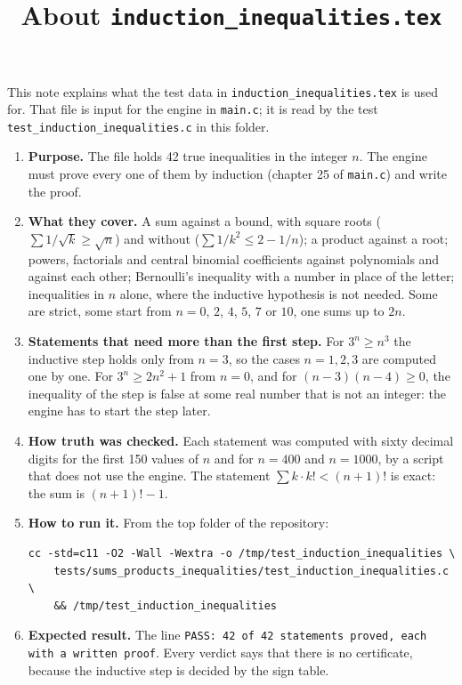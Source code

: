 \documentclass[11pt,a4paper]{article}
\title{About \texttt{induction\_inequalities.tex}}
\author{}
\date{}
\begin{document}
\maketitle
This note explains what the test data in \texttt{induction\_inequalities.tex} is used for. That file is input for the engine in \texttt{main.c}; it is read by the test \texttt{test\_induction\_inequalities.c} in this folder.

\begin{enumerate}
\item \textbf{Purpose.} The file holds 42 true inequalities in the integer $n$. The engine must prove every one of them by induction (chapter 25 of \texttt{main.c}) and write the proof.

\item \textbf{What they cover.} A sum against a bound, with square roots ($\sum 1/\sqrt{k} \ge \sqrt{n}$) and without ($\sum 1/k^{2} \le 2 - 1/n$); a product against a root; powers, factorials and central binomial coefficients against polynomials and against each other; Bernoulli's inequality with a number in place of the letter; inequalities in $n$ alone, where the inductive hypothesis is not needed. Some are strict, some start from $n = 0$, $2$, $4$, $5$, $7$ or $10$, one sums up to $2n$.

\item \textbf{Statements that need more than the first step.} For $3^{n} \ge n^{3}$ the inductive step holds only from $n = 3$, so the cases $n = 1, 2, 3$ are computed one by one. For $3^{n} \ge 2n^{2} + 1$ from $n = 0$, and for $(n - 3)(n - 4) \ge 0$, the inequality of the step is false at some real number that is not an integer: the engine has to start the step later.

\item \textbf{How truth was checked.} Each statement was computed with sixty decimal digits for the first 150 values of $n$ and for $n = 400$ and $n = 1000$, by a script that does not use the engine. The statement $\sum k \cdot k! < (n + 1)!$ is exact: the sum is $(n + 1)! - 1$.

\item \textbf{How to run it.} From the top folder of the repository:
\begin{verbatim}
cc -std=c11 -O2 -Wall -Wextra -o /tmp/test_induction_inequalities \
    tests/sums_products_inequalities/test_induction_inequalities.c \
    && /tmp/test_induction_inequalities
\end{verbatim}

\item \textbf{Expected result.} The line \texttt{PASS: 42 of 42 statements proved, each with a written proof}. Every verdict says that there is no certificate, because the inductive step is decided by the sign table.


\end{enumerate}
\end{document}

